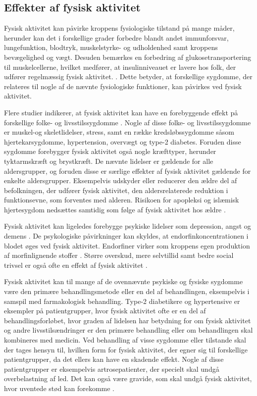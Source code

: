 \subsection{Effekter af fysisk aktivitet}\label{sec:effekterafaktivitet}
Fysisk aktivitet kan påvirke kroppens fysiologiske tilstand på mange måder, herunder kan det i forskellige grader forbedre blandt andet immunforsvar, lungefunktion, blodtryk, muskelstyrke- og udholdenhed samt kroppens bevægelighed og vægt. Desuden bemærkes en forbedring af glukosetransportering til muskelcellerne, hvilket medfører, at insulinniveauet er lavere hos folk, der udfører regelmæssig fysisk aktivitet. \citep{andersen2001, martini2015}. Dette betyder, at forskellige sygdomme, der relateres til nogle af de nævnte fysiologiske funktioner, kan påvirkes ved fysisk aktivitet.

Flere studier indikerer, at fysisk aktivitet kan have en forebyggende effekt på forskellige folke- og livsstilssygdomme \citep{warburton2010}. Nogle af disse folke- og livsstilssygdomme er muskel-og skeletlidelser, stress, samt en række kredsløbssygdomme såsom hjertekarsygdomme, hypertension, overvægt og type-2 diabetes. Foruden disse sygdomme forebygger fysisk aktivitet også nogle kræfttyper, herunder tyktarmskræft og brystkræft. De nævnte lidelser er gældende for alle aldersgrupper, og foruden disse er særlige effekter af fysisk aktivitet gældende for enkelte aldersgrupper. Eksempelvis udskyder eller reducerer den ældre del af befolkningen, der udfører fysisk aktivitet, den aldersrelaterede reduktion i funktionsevne, som forventes med alderen. Risikoen for apopleksi og islæmisk hjertesygdom nedsættes samtidig som følge af fysisk aktivitet hos ældre \citep{pedersen2011,
warburton2010}. 

Fysisk aktivitet kan ligeledes forebygge psykiske lidelser som depression, angst og demens \citep{pedersen2011}. De psykologiske påvirkninger kan skyldes, at endorfinkoncentrationen i blodet øges ved fysisk aktivitet. Endorfiner virker som kroppens egen produktion af morfinlignende stoffer \citep{kessing2016}. Større overskud, mere selvtillid samt bedre social trivsel er også ofte en effekt af fysisk aktivitet \citep{sundhedsstyrelsen2006}. 

Fysisk aktivitet kan til mange af de ovennævnte psykiske og fysiske sygdomme være den primære behandlingsmetode eller en del af behandlingen, eksempelvis i samspil med farmakologisk behandling. Type-2 diabetikere og hypertensive er eksempler på patientgrupper, hvor fysisk aktivitet ofte er en del af behandlingsforløbet, hvor graden af lidelsen har betydning for om fysisk aktivitet og andre livsstilsændringer er den primære behandling eller om behandlingen skal kombineres med medicin. Ved behandling af visse sygdomme eller tilstande skal der tages hensyn til, hvilken form for fysisk aktivitet, der egner sig til forskellige patientgrupper, da det ellers kan have en skadende effekt. Nogle af disse patientgrupper er eksempelvis artrosepatienter, der specielt skal undgå overbelastning af led. Det kan også være gravide, som skal undgå fysisk aktivitet, hvor uventede stød kan forekomme \citep{pedersen2011,andersen2001}.
